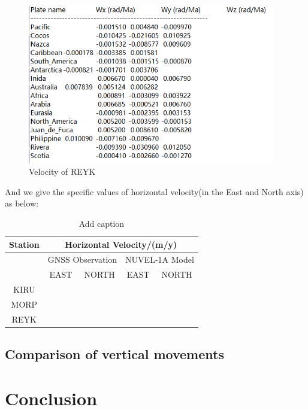 \documentclass{article}
\begin{document}
\begin{figure}[H]
  \centering
  \includegraphics[height=7cm]{../source/nuvel.png}
  \caption{Velocity of REYK}
  \label{fig:Vel_REYK}
\end{figure}

And we give the specific values of horizontal velocity(in the East and North axis) as below:
\begin{table}[htbp]
  \centering
  \caption{Add caption}
    \begin{tabular}{ccc|cc}
    \large Station & \multicolumn{4}{c}{\large Horizontal Velocity/(m/y)} \\[5pt]
    \midrule
          & \multicolumn{2}{c}{GNSS Observation} & \multicolumn{2}{c}{NUVEL-1A Model} \\[3pt]
          & EAST  & \multicolumn{1}{c}{NORTH} & EAST  & NORTH \\[4pt]
    \large KIRU  &       &       &       &  \\[4pt]
    \large MORP  &       &       &       &  \\[4pt]
    \large REYK  &       &       &       &  \\
    \end{tabular}%
  \label{tab:addlabel}%
\end{table}%






\subsection{Comparison of vertical movements}



\section{Conclusion}
\end{document}
